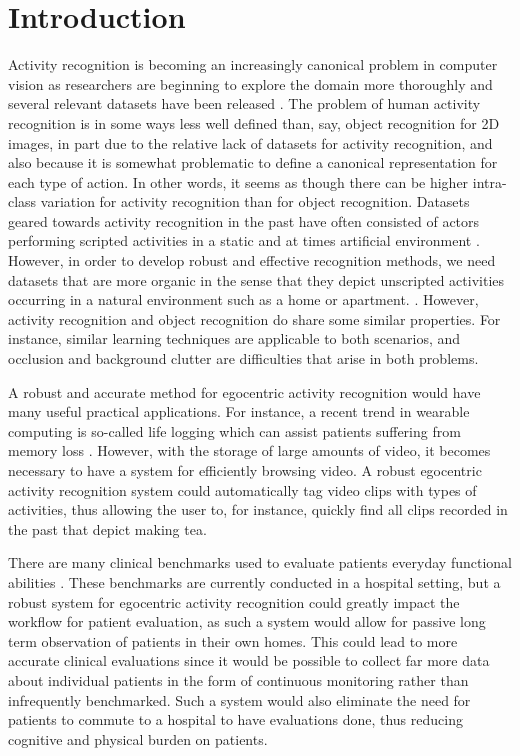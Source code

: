 \documentclass{bmvc2k}
\begin{document}
\section{Introduction}
	Activity recognition is becoming an increasingly canonical problem in
	computer vision as researchers are beginning to explore the domain more
  thoroughly and several relevant datasets have been released \cite{Schuldt04, Rodriguez08}. The problem 
	of human activity recognition is in some ways less well defined
	than, say, object recognition for 2D images, in part due to the relative
	lack of datasets for activity recognition, and also because it is somewhat
	problematic to define a canonical representation for each type of action.
	In other words, it seems as though there can be higher intra-class
	variation for activity recognition than for object recognition. 
	Datasets geared towards activity recognition in the past have often
	consisted of actors performing scripted activities in a static and at
  times artificial environment \cite{Schuldt04}. However, in order to develop robust and effective
	recognition methods, we need datasets that are more organic in the sense that they
	depict unscripted activities occurring in a natural environment such as a home or
	apartment.
	\cite{Ramanan12}. 
	However, activity recognition and object recognition do share some
	similar properties. For instance, similar learning techniques are applicable to both
  scenarios, and occlusion and background clutter are
	difficulties that arise in both problems.

	A robust and accurate method for egocentric activity recognition would have 
	many useful practical applications. For instance,
	a recent trend in wearable computing is so-called life logging which can
	assist patients suffering from memory loss \cite{Sellen07}. However, with
	the storage of large amounts of video, it becomes necessary to have a system for
	efficiently browsing video. A robust egocentric activity recognition
	system could automatically tag video clips with types of activities,
	thus allowing the user to, for
	instance, quickly find all clips recorded in the past that depict making tea.

	There are many clinical benchmarks used to evaluate patients everyday
	functional abilities \cite{Kopp97, Catz97, Itzkovich07}. 
	These benchmarks are currently conducted in a
	hospital setting, but a robust system for egocentric activity recognition
	could greatly impact the workflow for patient evaluation, as such a system
	would allow for passive long term observation of patients in their own
	homes. This could lead to more accurate clinical evaluations since it would be
	possible to collect far more data about individual patients in the form of continuous 
  monitoring rather than infrequently benchmarked. Such a system
	would also eliminate the need for patients to commute to a hospital to have
	evaluations done, thus reducing cognitive and physical burden on patients.
	
\end{document}
